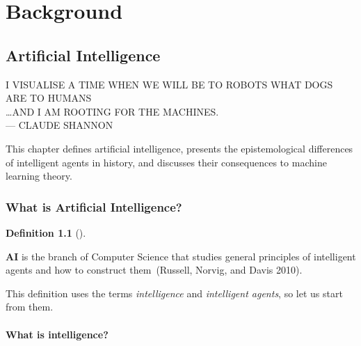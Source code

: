 \documentclass[
  letterpaper,
  12pt,
  british]{tufte-book}
\renewcommand{\textls}[2][5]{%
  \begingroup\addfontfeatures{LetterSpace=#1}#2\endgroup
}
\renewcommand{\allcaps}[1]{\textls[15]{\MakeTextUppercase{#1}}}
\newcommand{\epigraph}[2]{%
  \begin{fullwidth}
  \begin{flushright}
  \sffamily\fontsize{8}{10}\selectfont
  \sffamily\footnotesize
  \begin{doublespace}
  \vspace{-8cm}\noindent\allcaps{#1}\\%
  \noindent\allcaps{#2}\\%
  \end{doublespace}
  \vspace{5.1cm}
  \end{flushright}
  \end{fullwidth}
  \normalfont
}
\renewenvironment{quote}{
  \list{}{\leftmargin=3.5cm\topsep=0pt}
  \item\relax\small\itshape
}
{\endlist}
\theoremstyle{plain}
\theoremstyle{definition}
\newtheorem{definition}{Definition}[chapter]
\theoremstyle{plain}
\theoremstyle{remark}
\begin{document}
\begin{quote}
\end{quote}

\part{Background}

\hypertarget{artificial-intelligence}{%
\chapter{Artificial Intelligence}\label{artificial-intelligence}}

\epigraph{I visualise a time when we will be to robots what dogs are to humans \\
\ldots and I am rooting for the machines.}{--- Claude Shannon}

This chapter defines artificial intelligence, presents the
epistemological differences of intelligent agents in history, and
discusses their consequences to machine learning theory.

\hypertarget{artificial-intelligence}{%
\section{What is Artificial
Intelligence?}\label{artificial-intelligence}}

\leavevmode{}%
\begin{definition}[]\label{def-ai}

\textbf{AI} is the branch of Computer Science that studies general
principles of intelligent agents and how to construct them~(Russell,
Norvig, and Davis
2010).

\end{definition}

This definition uses the terms \emph{intelligence} and \emph{intelligent
agents}, so let us start from them.

\hypertarget{what-is-intelligence}{%
\subsection{What is intelligence?}\label{what-is-intelligence}}
\end{document}
